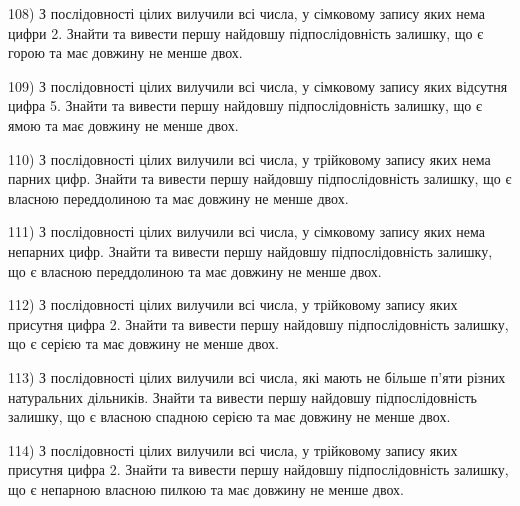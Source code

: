 \documentclass[11pt, ukrainian]{article}
\begin{document}
\par
\vspace{0.9cm}
108) \space 
З послідовності цілих вилучили всі числа, у сімковому запису яких нема цифри 2. Знайти та вивести першу найдовшу підпослідовність залишку, що є горою та має довжину не менше двох.

\par
\vspace{0.9cm}
109) \space 
З послідовності цілих вилучили всі числа, у сімковому запису яких відсутня цифра 5. Знайти та вивести першу найдовшу підпослідовність залишку, що є ямою та має довжину не менше двох.

\par
\vspace{0.9cm}
110) \space 
З послідовності цілих вилучили всі числа, у трійковому запису яких нема парних цифр. Знайти та вивести першу найдовшу підпослідовність залишку, що є власною переддолиною та має довжину не менше двох.

\par
\vspace{0.9cm}
111) \space 
З послідовності цілих вилучили всі числа, у сімковому запису яких нема непарних цифр. Знайти та вивести першу найдовшу підпослідовність залишку, що є власною переддолиною та має довжину не менше двох.

\par
\vspace{0.9cm}
112) \space 
З послідовності цілих вилучили всі числа, у трійковому запису яких присутня цифра 2. Знайти та вивести першу найдовшу підпослідовність залишку, що є серією та має довжину не менше двох.

\par
\vspace{0.9cm}
113) \space 
З послідовності цілих вилучили всі числа, які мають не більше п'яти різних натуральних дільників. Знайти та вивести першу найдовшу підпослідовність залишку, що є власною спадною серією та має довжину не менше двох.

\par
\vspace{0.9cm}
114) \space 
З послідовності цілих вилучили всі числа, у трійковому запису яких присутня цифра 2. Знайти та вивести першу найдовшу підпослідовність залишку, що є непарною власною пилкою та має довжину не менше двох.
\end{document}
